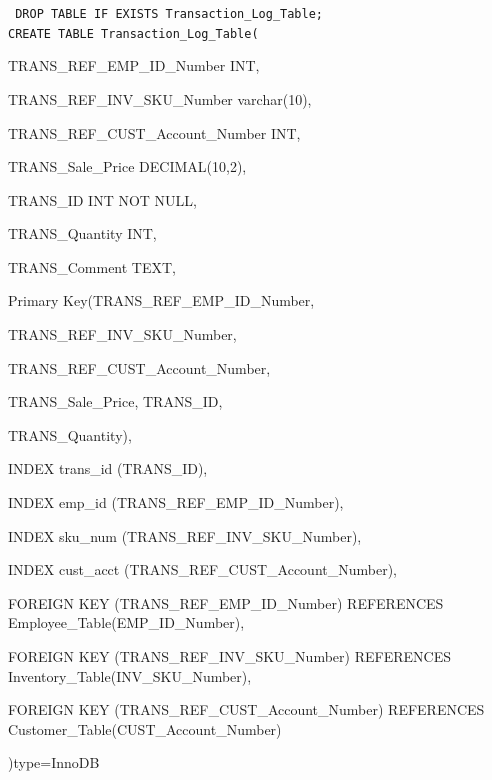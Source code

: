 \documentclass{report}
\begin{document}
        {\tt\small
        DROP TABLE IF EXISTS Transaction\_Log\_Table;\\

        CREATE TABLE Transaction\_Log\_Table(
        \begin{list}{}
            \item{TRANS\_REF\_EMP\_ID\_Number                 INT,}
            \item{TRANS\_REF\_INV\_SKU\_Number                varchar(10),}
            \item{TRANS\_REF\_CUST\_Account\_Number           INT,}
            \item{TRANS\_Sale\_Price                        DECIMAL(10,2),}
            \item{TRANS\_ID                                INT NOT NULL,}
            \item{TRANS\_Quantity                          INT,}
            \item{TRANS\_Comment                           TEXT,}
            \item{Primary Key(TRANS\_REF\_EMP\_ID\_Number,}
            \begin{list}{}
                \item{TRANS\_REF\_INV\_SKU\_Number,}
                \item{TRANS\_REF\_CUST\_Account\_Number,}
                \item{TRANS\_Sale\_Price, TRANS\_ID,}
                \item{TRANS\_Quantity),}
            \end{list}
            \item{INDEX trans\_id (TRANS\_ID),}
            \item{INDEX emp\_id (TRANS\_REF\_EMP\_ID\_Number),}
            \item{INDEX sku\_num (TRANS\_REF\_INV\_SKU\_Number),}
            \item{INDEX cust\_acct (TRANS\_REF\_CUST\_Account\_Number),}
            \item{FOREIGN KEY (TRANS\_REF\_EMP\_ID\_Number) REFERENCES Employee\_Table(EMP\_ID\_Number),}
            \item{FOREIGN KEY (TRANS\_REF\_INV\_SKU\_Number) REFERENCES Inventory\_Table(INV\_SKU\_Number),}
            \item{FOREIGN KEY (TRANS\_REF\_CUST\_Account\_Number) REFERENCES Customer\_Table(CUST\_Account\_Number)}
        \end{list}
        )type=InnoDB\\
        }
\end{document}
